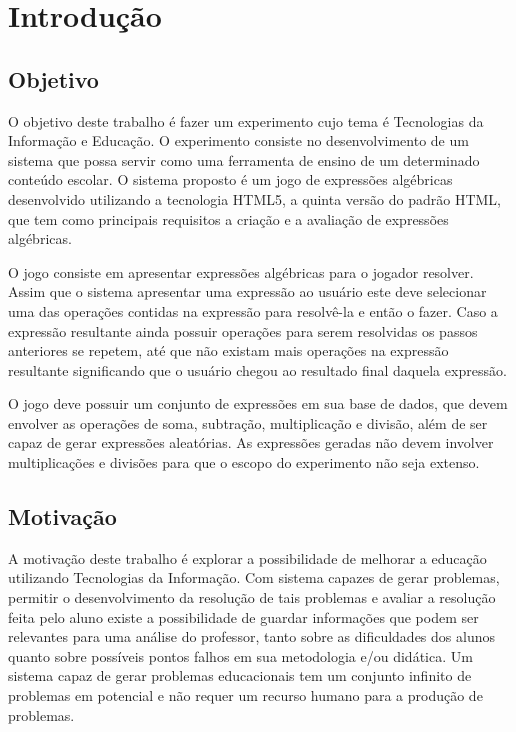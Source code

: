 \chapter*[Introdução]{Introdução}

\section{Objetivo}
O objetivo deste trabalho é fazer um experimento cujo tema é Tecnologias da Informação e Educação. O experimento consiste no desenvolvimento de um sistema que possa servir como uma ferramenta de ensino de um determinado conteúdo escolar. O sistema proposto é um jogo de expressões algébricas desenvolvido utilizando a tecnologia HTML5, a quinta versão do padrão HTML, que tem como principais requisitos a criação e a avaliação de expressões algébricas.

	O jogo consiste em apresentar expressões algébricas para o jogador resolver.
Assim que o sistema apresentar uma expressão ao usuário este deve selecionar uma das operações contidas na expressão para resolvê-la e então o fazer. Caso a expressão resultante ainda possuir operações para serem resolvidas os passos anteriores se repetem, até que não existam mais operações na expressão resultante significando que o usuário chegou ao resultado final daquela expressão.

	O jogo deve possuir um conjunto de expressões em sua base de dados, que devem envolver as operações de soma, subtração, multiplicação e divisão, além de ser capaz de gerar expressões aleatórias. As expressões geradas não devem involver multiplicações e divisões para que o escopo do experimento não seja extenso.

\section{Motivação}
A motivação deste trabalho é explorar a possibilidade de melhorar a educação utilizando Tecnologias da Informação. Com sistema capazes de gerar problemas, permitir o desenvolvimento da resolução de tais problemas e avaliar a resolução feita pelo aluno existe a possibilidade de guardar informações que podem ser relevantes para uma análise do professor, tanto sobre as dificuldades dos alunos quanto sobre possíveis pontos falhos em sua metodologia e/ou didática. Um sistema capaz de gerar problemas educacionais tem um conjunto infinito de problemas em potencial e não requer um recurso humano para a produção de problemas.
	
